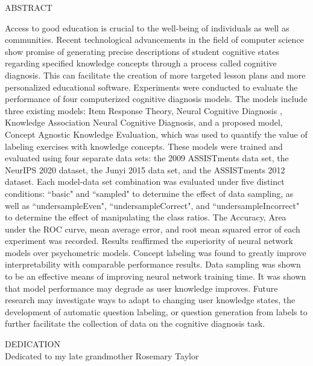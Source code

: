 \documentclass[letterpaper, 12pt, captions=tableabove]{scrreprt}
\begin{document}
\doublespacing
\begin{center}
	ABSTRACT
\end{center}
	
	Access to good education is crucial to the well-being of individuals as well as communities.  Recent technological advancements in the field of computer science show promise of generating precise descriptions of student cognitive states regarding specified knowledge concepts through a process called cognitive diagnosis. This can facilitate the creation of more targeted lesson plans and more personalized educational software. Experiments were conducted to evaluate the performance of four computerized cognitive diagnosis models. The models include three existing models: Item Response Theory, Neural Cognitive Diagnosis , Knowledge Association Neural Cognitive Diagnosis, and a proposed model, Concept Agnostic Knowledge Evaluation, which was used to quantify the value of labeling exercises with knowledge concepts. These models were trained and evaluated using four separate data sets: the 2009 ASSISTments data set, the NeurIPS 2020 dataset, the Junyi 2015 data set, and the ASSISTments 2012 dataset. Each model-data set combination was evaluated under five distinct conditions: ``basic" and ``sampled" to determine the effect of data sampling, as well as ``undersampleEven", ``undersampleCorrect", and ``undersampleIncorrect" to determine the effect of manipulating the class ratios. The Accuracy, Area under the ROC curve, mean average error, and root mean squared error of each experiment was recorded. Results reaffirmed the superiority of neural network models over psychometric models. Concept labeling was found to greatly improve interpretability with comparable performance results. Data sampling was shown to be an effective means of improving neural network training time. It was shown that model performance may degrade as user knowledge improves. Future research may investigate ways to adapt to changing user knowledge states, the development of automatic question labeling, or question generation from labels to further facilitate the collection of data on the cognitive diagnosis task. 

\setcounter{page}{3}
\newpage

\begin{center}
	DEDICATION \\ Dedicated to my late grandmother Rosemary Taylor
\end{center}

\newpage
\end{document}
